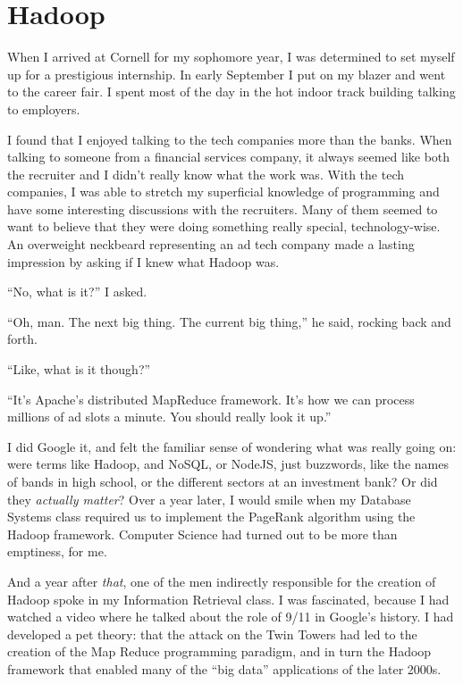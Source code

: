 \documentclass[12pt]{article}
\begin{document}
\section{Hadoop}
When I arrived at Cornell for my sophomore year, I was determined to set myself
up for a prestigious internship.  In early September I put on my blazer and went
to the career fair.  I spent most of the day in the hot indoor track building
talking to employers. 

I found that I enjoyed talking to the tech companies more than the banks.  When
talking to someone from a financial services company, it always seemed like both
the recruiter and I didn't really know what the work was.  With the tech
companies, I was able to stretch my superficial knowledge of programming and
have some interesting discussions with the recruiters.  Many of them seemed to
want to believe that they were doing something really special, technology-wise.
An overweight neckbeard representing an ad tech company made a lasting impression 
by asking if I knew what Hadoop was.  

``No, what is it?'' I asked.

``Oh, man.  The next big thing.  The current big thing,'' he said,
rocking back and forth.

``Like, what is it though?''

``It's Apache's distributed MapReduce framework.  It's how we can process
millions of ad slots a minute.  You should really look it up.''

I did Google it, and felt the familiar sense of wondering what was really going
on: were terms like Hadoop, and NoSQL, or NodeJS, just buzzwords, like the names
of bands in high school, or the different sectors at an investment bank?  Or did
they \textit{actually matter}?  Over a year later, I would smile when my Database Systems class
required us to implement the PageRank algorithm using the Hadoop framework.
Computer Science had turned out to be more than emptiness, for me.

And a year after \textit{that}, one of the men indirectly responsible for the
creation of Hadoop spoke in my Information Retrieval class.  I was fascinated,
because I had watched a video where he talked about the role of 9/11 in Google's
history.  I had developed a pet theory: that the attack on the Twin Towers had
led to the creation of the Map Reduce programming paradigm, and in turn the
Hadoop framework that enabled many of the ``big data'' applications of the later
2000s.
\end{document}
